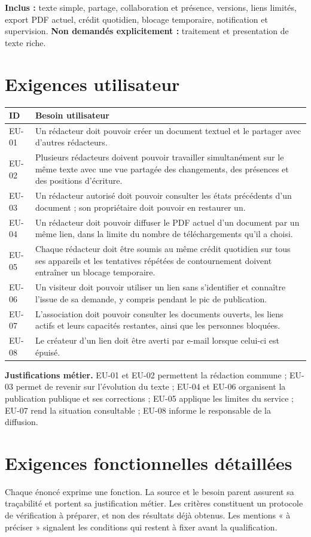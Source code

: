 \textbf{Inclus :} texte simple, partage, collaboration et présence, versions, liens limités, export PDF actuel, crédit quotidien, blocage temporaire, notification et supervision. 
\textbf{Non demandés explicitement :} traitement et presentation de texte riche.

\section{Exigences utilisateur}
\begin{longtable}{@{}L{15mm}L{99mm}@{}}
\toprule ID & Besoin utilisateur \\\midrule\endhead
EU-01 & Un rédacteur doit pouvoir créer un document textuel et le partager avec d'autres rédacteurs. \\
EU-02 & Plusieurs rédacteurs doivent pouvoir travailler simultanément sur le même texte avec une vue partagée des changements, des présences et des positions d'écriture.\\
EU-03 & Un rédacteur autorisé doit pouvoir consulter les états précédents d'un document ; son propriétaire doit pouvoir en restaurer un. \\
EU-04 & Un rédacteur doit pouvoir diffuser le PDF actuel d'un document par un même lien, dans la limite du nombre de téléchargements qu'il a choisi.\\
EU-05 & Chaque rédacteur doit être soumis au même crédit quotidien sur tous ses appareils et les tentatives répétées de contournement doivent entraîner un blocage temporaire.\\
EU-06 & Un visiteur doit pouvoir utiliser un lien sans s'identifier et connaître l'issue de sa demande, y compris pendant le pic de publication. \\
EU-07 & L'association doit pouvoir consulter les documents ouverts, les liens actifs et leurs capacités restantes, ainsi que les personnes bloquées.\\
EU-08 & Le créateur d'un lien doit être averti par e-mail lorsque celui-ci est épuisé. \\
\bottomrule\end{longtable}
\textbf{Justifications métier.} 
EU-01 et EU-02 permettent la rédaction commune ; EU-03 permet de revenir sur l'évolution du texte ;
 EU-04 et EU-06 organisent la publication publique et ses corrections ; 
 EU-05 applique les limites du service ; 
 EU-07 rend la situation consultable ; 
 EU-08 informe le responsable de la diffusion.

\section{Exigences fonctionnelles détaillées}
Chaque énoncé exprime une fonction. La source et le besoin parent assurent sa traçabilité et portent sa justification métier. Les critères constituent un protocole de vérification à préparer, et non des résultats déjà obtenus. Les mentions « à préciser » signalent les conditions qui restent à fixer avant la qualification.
